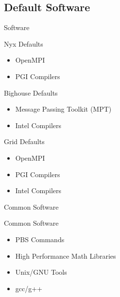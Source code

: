 \documentclass{beamer}
\begin{document}
  \subsection {Default Software}
  \begin{frame}{Software}
    \begin{block}{Nyx Defaults}
    \begin{itemize}
      \item OpenMPI
      \item PGI Compilers
    \end{itemize}
    \end{block}
    \begin{block}{Bighouse Defaults}
    \begin{itemize}
      \item Message Passing Toolkit (MPT)
      \item Intel Compilers
    \end{itemize}
    \end{block}
    \begin{block}{Grid Defaults}
      \begin{itemize}
        \item OpenMPI
        \item PGI Compilers
        \item Intel Compilers
      \end{itemize}
    \end{block}
  \end{frame}

  \begin{frame}{Common Software}
   \begin{block}{Common Software}
    \begin{itemize}
     \item PBS Commands
     \item High Performance Math Libraries
     \item Unix/GNU Tools
     \item gcc/g++
    \end{itemize}
   \end{block}
  \end{frame}
\end{document}
